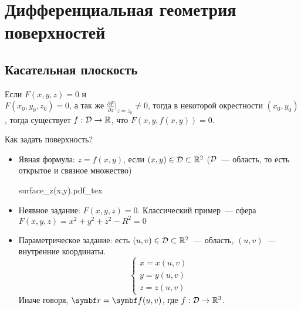 \documentclass[main]{subfiles}
\begin{document}
\part{Дифференциальная геометрия поверхностей}
\chapter{Касательная плоскость}
\begin{theorem*}
    Если $F(x,y,z) = 0$ и \\
    $F(x_0, y_0,z_0) = 0$,
    а так же $\frac{\partial F}{\partial z}\rvert_{z = z_0} \neq 0$,
    тогда в некоторой окрестности $(x_0, y_0)$,
    тогда существует $f: \mathcal{D} \to \mathbb{R}$, что $F(x, y, f(x,y)) =0$.
\end{theorem*}

Как задать поверхность?
\begin{itemize}
    \item Явная формула: $z = f(x,y)$, если $(x,y) \in \mathcal{D} \subset \mathbb{R}^2$
          ($\mathcal{D}$~--- область, то есть открытое и связное множество)
          \begin{center}
              {surface_z(x,y).pdf_tex}
          \end{center}
    \item Неявное задание: $F(x,y,z) = 0$. Классический пример~--- сфера
          $F(x,y,z)=x^2 + y^2 + z^2 - R^2 = 0$
    \item Параметрическое задание:
          есть $(u,v) \in \mathcal{D} \subset \mathbb{R}^2$~--- область,
          $(u,v)$~--- внутренние координаты.
          \[\begin{cases}
                  x = x(u,v) \\
                  y = y(u,v) \\
                  z = z(u,v)
              \end{cases}\]
          Иначе говоря, $\vr = \vf(u,v)$, где $f: \mathcal{D} \to \mathbb{R}^3$.
\end{itemize}
\end{document}
